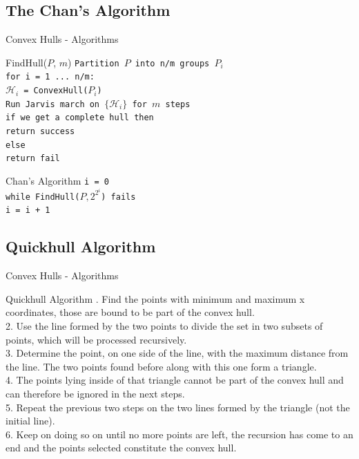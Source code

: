 \documentclass{beamer}
\begin{document}
\subsection{The Chan's Algorithm}
\begin{frame}{Convex Hulls - Algorithms}
\begin{block}{FindHull($P$, $m$)}
\fontsize{6pt}{7.2}\selectfont
\texttt{Partition $P$ into n/m groups $P_i$\\
for i = 1 ... n/m: \\
	\hspace*{1cm} $\mathcal{H}_i$ = ConvexHull($P_i$) \\
Run Jarvis march on $\lbrace \mathcal{H}_i \rbrace$ for $m$ steps \\
if we get a complete hull then \\
	\hspace*{1cm} return success\\
else \\
	\hspace*{1cm} return fail}
\end{block}
\begin{block}{Chan's Algorithm}
\fontsize{6pt}{7.2}\selectfont
\texttt{i = 0 \\
while FindHull($P, 2^{2^i}$) fails \\
	\hspace*{1cm}i = i + 1}
\end{block}
\end{frame}

\subsection{Quickhull Algorithm}
\begin{frame}{Convex Hulls - Algorithms}
\begin{block}{Quickhull Algorithm}
\fontsize{9pt}{7.2}. Find the points with minimum and maximum x coordinates, those are bound to be part of the convex hull. \\
2. Use the line formed by the two points to divide the set in two subsets of points, which will be processed recursively. \\
3. Determine the point, on one side of the line, with the maximum distance from the line. The two points found before along with this one form a triangle. \\
4. The points lying inside of that triangle cannot be part of the convex hull and can therefore be ignored in the next steps. \\
5. Repeat the previous two steps on the two lines formed by the triangle (not the initial line). \\
6. Keep on doing so on until no more points are left, the recursion has come to an end and the points selected constitute the convex hull. \\
\end{block}
\end{frame}
\end{document}
